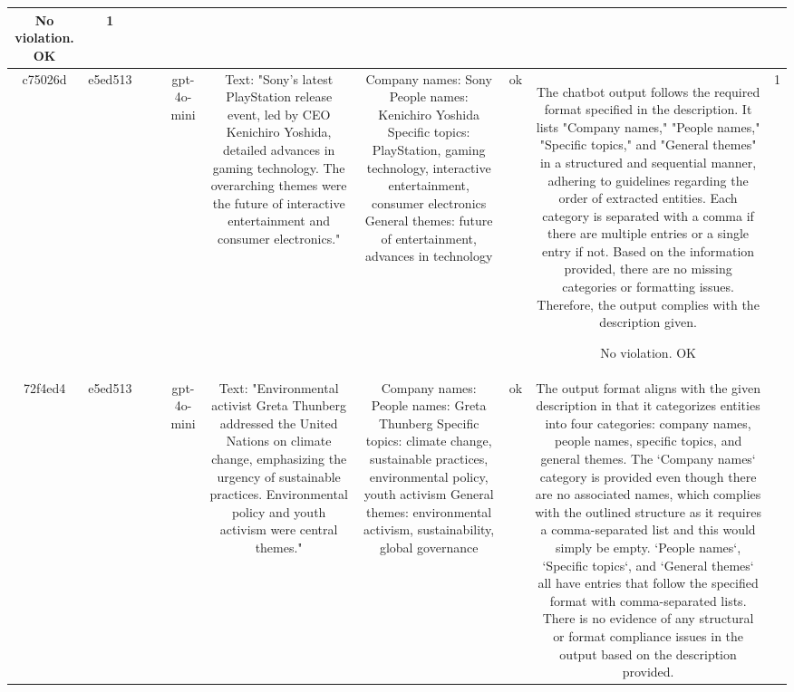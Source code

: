 \begin{table}[h!]
\begin{tabular}{|c|c|c|c|c|c|c|c|c|c|}
No violation.
OK & 1\\
\hline
c75026d & e5ed513 &  &  & gpt-4o-mini & Text: "Sony's latest PlayStation release event, led by CEO Kenichiro Yoshida, detailed advances in gaming technology. The overarching themes were the future of interactive entertainment and consumer electronics." & Company names: Sony
People names: Kenichiro Yoshida
Specific topics: PlayStation, gaming technology, interactive entertainment, consumer electronics
General themes: future of entertainment, advances in technology & ok & The chatbot output follows the required format specified in the description. It lists "Company names," "People names," "Specific topics," and "General themes" in a structured and sequential manner, adhering to guidelines regarding the order of extracted entities. Each category is separated with a comma if there are multiple entries or a single entry if not. Based on the information provided, there are no missing categories or formatting issues. Therefore, the output complies with the description given.

No violation.
OK & 1\\
\hline
72f4ed4 & e5ed513 &  &  & gpt-4o-mini & Text: "Environmental activist Greta Thunberg addressed the United Nations on climate change, emphasizing the urgency of sustainable practices. Environmental policy and youth activism were central themes." & Company names:  
People names: Greta Thunberg  
Specific topics: climate change, sustainable practices, environmental policy, youth activism  
General themes: environmental activism, sustainability, global governance & ok & The output format aligns with the given description in that it categorizes entities into four categories: company names, people names, specific topics, and general themes. The `Company names` category is provided even though there are no associated names, which complies with the outlined structure as it requires a comma-separated list and this would simply be empty. `People names`, `Specific topics`, and `General themes` all have entries that follow the specified format with comma-separated lists. There is no evidence of any structural or format compliance issues in the output based on the description provided.


\end{tabular}
\end{table}
